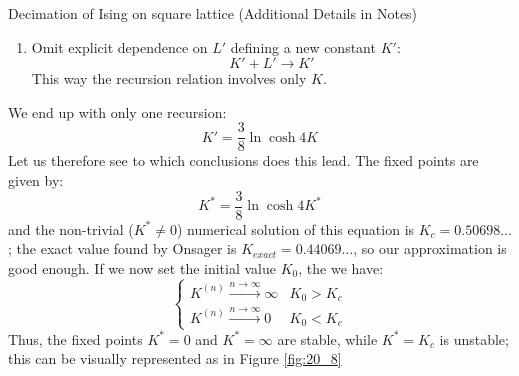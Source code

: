 \documentclass[../../Main/Main.tex]{subfiles}
\begin{document}
\begin{example}{Decimation of Ising on square lattice (Additional Details in Notes)}{}
\begin{enumerate}
\item Omit explicit dependence on \( L' \) defining a new constant \( K' \):
\begin{equation*}
   K'+L' \rightarrow K'
\end{equation*}
This way the recursion relation involves only \( K \).
\end{enumerate}
We end up with only one recursion:
\begin{equation*}
  K' = \frac{3}{8} \ln{\cosh 4 K}
\end{equation*}
Let us therefore see to which conclusions does this lead. The fixed points are given by:
\begin{equation*}
  K^* = \frac{3}{8} \ln{\cosh 4 K^*}
\end{equation*}
and the non-trivial (\( K^* \neq 0 \)) numerical solution of this equation is \( K_c=0.50698\dots \); the exact value found by Onsager is \( K_{exact}=
0.44069\dots \), so our approximation is good enough.
If we now set the initial value \( K_0 \), the we have:
\begin{equation*}
  \begin{cases}
   K^{(n)} \overset{n \rightarrow \infty }{\longrightarrow} \infty  & K_0 > K_c \\
   K^{(n)} \overset{n \rightarrow \infty }{\longrightarrow} 0  & K_0 < K_c
  \end{cases}
\end{equation*}
Thus, the fixed points \( K^*=0 \) and  \( K^* = \infty \)  are stable, while \( K^* = K_c \) is unstable; this can be visually represented as in Figure \ref{fig:20_8}



\end{example}
\end{document}
